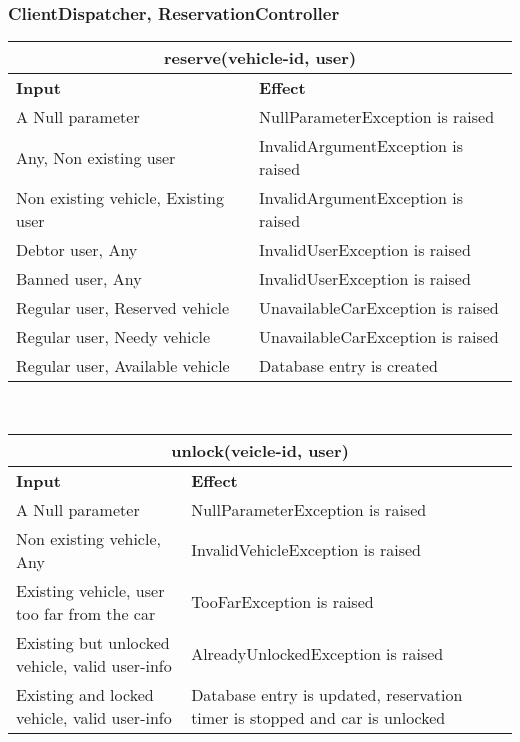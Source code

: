 \subsubsection{ClientDispatcher, ReservationController}

\begin{tabular}{|p{5cm}|p{7cm}|}
\hline
\multicolumn{2}{|c|}{reserve(vehicle-id, user)} \\
\hline
\textbf{Input} & \textbf{Effect} \\

\hline
A Null parameter & NullParameterException is raised \\

\hline
Any, Non existing user & InvalidArgumentException is raised \\
\hline
Non existing vehicle, Existing user & InvalidArgumentException is raised \\

\hline
Debtor user, Any & InvalidUserException is raised \\

\hline
Banned user, Any & InvalidUserException is raised \\

\hline
Regular user, Reserved vehicle  & UnavailableCarException is raised \\

\hline
Regular user, Needy vehicle & UnavailableCarException is raised \\

\hline
Regular user, Available vehicle & Database entry is created \\
\hline
\end{tabular}
\\
\begin{tabular}{|p{5cm}|p{7cm}|}
\hline
\multicolumn{2}{|c|}{unlock(veicle-id, user)} \\
\hline
\textbf{Input} & \textbf{Effect} \\

\hline
A Null parameter & NullParameterException is raised \\

\hline
Non existing vehicle, Any & InvalidVehicleException is raised \\

\hline
Existing vehicle, user too far from the car & TooFarException is raised \\

\hline
Existing but unlocked vehicle, valid user-info & AlreadyUnlockedException is raised \\

\hline
Existing and locked vehicle, valid user-info & Database entry is updated, reservation timer is stopped and car is unlocked \\
\hline
\end{tabular}

